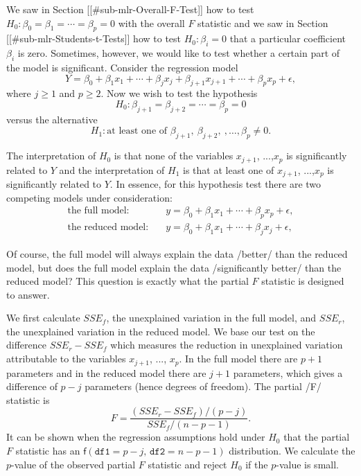 We saw in Section [[#sub-mlr-Overall-F-Test]] how to test
\(H_{0}:\beta_{0}=\beta_{1}=\cdots=\beta_{p}=0\) with the overall
\(F\) statistic and we saw in Section [[#sub-mlr-Students-t-Tests]] how to
test \(H_{0}:\beta_{i}=0\) that a particular coefficient \(\beta_{i}\)
is zero. Sometimes, however, we would like to test whether a certain
part of the model is significant. Consider the regression model
\begin{equation}
Y=\beta_{0}+\beta_{1}x_{1}+\cdots+\beta_{j}x_{j}+\beta_{j+1}x_{j+1}+\cdots+\beta_{p}x_{p}+\epsilon,
\end{equation}
where \(j\geq1\) and \(p\geq2\). Now we wish to test the hypothesis
\begin{equation}
H_{0}:\beta_{j+1}=\beta_{j+2}=\cdots=\beta_{p}=0
\end{equation}
versus the alternative 
\begin{equation}
H_{1}:\mbox{at least one of $\beta_{j+1},\ \beta_{j+2},\ ,\ldots,\beta_{p}\neq0$}.
\end{equation}

The interpretation of \(H_{0}\) is that none of the variables
\(x_{j+1}\), ...,\(x_{p}\) is significantly related to \(Y\) and the
interpretation of \(H_{1}\) is that at least one of \(x_{j+1}\),
...,\(x_{p}\) is significantly related to \(Y\). In essence, for this
hypothesis test there are two competing models under consideration:
\begin{align}
\mbox{the full model:} & \quad y=\beta_{0}+\beta_{1}x_{1}+\cdots+\beta_{p}x_{p}+\epsilon,\\
\mbox{the reduced model:} & \quad y=\beta_{0}+\beta_{1}x_{1}+\cdots+\beta_{j}x_{j}+\epsilon,
\end{align}

Of course, the full model will always explain the data /better/ than
the reduced model, but does the full model explain the data
/significantly better/ than the reduced model? This question is
exactly what the partial \(F\) statistic is designed to answer.

We first calculate \(SSE_{f}\), the unexplained variation in the full
model, and \(SSE_{r}\), the unexplained variation in the reduced
model. We base our test on the difference \(SSE_{r}-SSE_{f}\) which
measures the reduction in unexplained variation attributable to the
variables \(x_{j+1}\), ..., \(x_{p}\). In the full model there are
\(p+1\) parameters and in the reduced model there are \(j+1\)
parameters, which gives a difference of \(p-j\) parameters (hence
degrees of freedom). The partial /F/ statistic is
\begin{equation}
F=\frac{(SSE_{r}-SSE_{f})/(p-j)}{SSE_{f}/(n-p-1)}.
\end{equation}
It can be shown when the regression assumptions hold under \(H_{0}\)
that the partial \(F\) statistic has an
\(\mathsf{f}(\mathtt{df1}=p-j,\,\mathtt{df2}=n-p-1)\) distribution. We
calculate the \(p\)-value of the observed partial \(F\) statistic and
reject \(H_{0}\) if the \(p\)-value is small.

